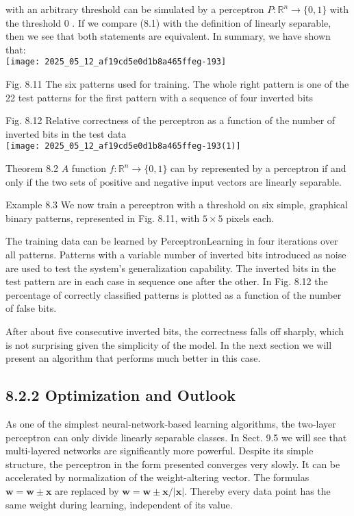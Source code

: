 \documentclass[10pt]{article}
\begin{document}
with an arbitrary threshold can be simulated by a perceptron $P: \mathbb{R}^{n} \rightarrow\{0,1\}$ with the threshold 0 . If we compare (8.1) with the definition of linearly separable, then we see that both statements are equivalent. In summary, we have shown that:\\
\texttt{[image: 2025\_05\_12\_af19cd5e0d1b8a465ffeg-193]}

Fig. 8.11 The six patterns used for training. The whole right pattern is one of the 22 test patterns for the first pattern with a sequence of four inverted bits

Fig. 8.12 Relative correctness of the perceptron as a function of the number of inverted bits in the test data\\
\texttt{[image: 2025\_05\_12\_af19cd5e0d1b8a465ffeg-193(1)]}

Theorem 8.2 $A$ function $f: \mathbb{R}^{n} \rightarrow\{0,1\}$ can by represented by a perceptron if and only if the two sets of positive and negative input vectors are linearly separable.

Example 8.3 We now train a perceptron with a threshold on six simple, graphical binary patterns, represented in Fig. 8.11, with $5 \times 5$ pixels each.

The training data can be learned by PerceptronLearning in four iterations over all patterns. Patterns with a variable number of inverted bits introduced as noise are used to test the system's generalization capability. The inverted bits in the test pattern are in each case in sequence one after the other. In Fig. 8.12 the percentage of correctly classified patterns is plotted as a function of the number of false bits.

After about five consecutive inverted bits, the correctness falls off sharply, which is not surprising given the simplicity of the model. In the next section we will present an algorithm that performs much better in this case.

\subsection*{8.2.2 Optimization and Outlook}
As one of the simplest neural-network-based learning algorithms, the two-layer perceptron can only divide linearly separable classes. In Sect. 9.5 we will see that multi-layered networks are significantly more powerful. Despite its simple\\
structure, the perceptron in the form presented converges very slowly. It can be accelerated by normalization of the weight-altering vector. The formulas $\boldsymbol{w}=\boldsymbol{w} \pm \boldsymbol{x}$ are replaced by $\boldsymbol{w}=\boldsymbol{w} \pm \boldsymbol{x} /|\boldsymbol{x}|$. Thereby every data point has the same weight during learning, independent of its value.
\end{document}
